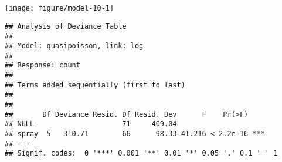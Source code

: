 \begin{knitrout}
\color{fgcolor}\begin{kframe}
\begin{alltt}
 \hlkwb{<-}  \hlopt{~}     
  \hlstd{=} \hlstd{)}
\end{alltt}
\end{kframe}
\texttt{[image: figure/model-10-1]} 
\begin{kframe}\begin{alltt}
  \hlstd{=} \hlstd{)}
\end{alltt}
\begin{verbatim}
## Analysis of Deviance Table
## 
## Model: quasipoisson, link: log
## 
## Response: count
## 
## Terms added sequentially (first to last)
## 
## 
##       Df Deviance Resid. Df Resid. Dev      F    Pr(>F)    
## NULL                     71     409.04                     
## spray  5   310.71        66      98.33 41.216 < 2.2e-16 ***
## ---
## Signif. codes:  0 '***' 0.001 '**' 0.01 '*' 0.05 '.' 0.1 ' ' 1
\end{verbatim}
\end{kframe}
\end{knitrout}
